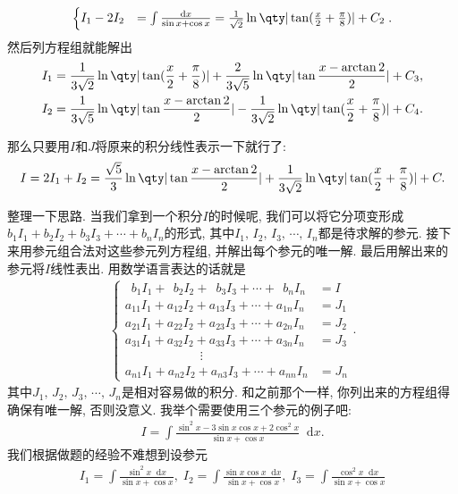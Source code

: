 \documentclass{ctexbook}
\newcommand*{\dif}{\mathop{}\!\mathrm{d}}
\begin{document}
{\begin{align*}
\begin{cases}
I_{1}-2I_{2}&=\int\frac{\dif{x}}{\sin{x}+\cos{x}}=\frac{1}{\sqrt{2}}\ln\qty|\tan(\frac{x}{2}+\frac{\pi}{8})|+C_{2}
\end{cases}
.\end{align*}
然后列方程组就能解出
\begin{align*}
I_{1}={}&\frac{1}{3\sqrt{2}}\ln\qty|\tan(\frac{x}{2}+\frac{\pi}{8})|+\frac{2}{3\sqrt{5}}\ln\qty|\tan{\frac{x-\arctan{2}}{2}}|+C_{3},\\
I_{2}={}&\frac{1}{3\sqrt{5}}\ln\qty|\tan{\frac{x-\arctan{2}}{2}}|-\frac{1}{3\sqrt{2}}\ln\qty|\tan(\frac{x}{2}+\frac{\pi}{8})|+C_{4}
.\end{align*}\par
那么只要用$I$和$J$将原来的积分线性表示一下就行了: 
\begin{align*}
I=2I_{1}+I_{2}=\frac{\sqrt{5}}{3}\ln\qty|\tan{\frac{x-\arctan{2}}{2}}|+\frac{1}{3\sqrt{2}}\ln\qty|\tan(\frac{x}{2}+\frac{\pi}{8})|+C
.\end{align*}\par
整理一下思路. 当我们拿到一个积分$I$的时候呢, 我们可以将它分项变形成$b_{1}I_{1}+b_{2}I_{2}+b_{3}I_{3}+\cdots+b_{n}I_{n}$的形式, 其中$I_{1},\,I_{2},\,I_{3},\,\cdots,\,I_{n}$都是待求解的参元. 接下来用参元组合法对这些参元列方程组, 并解出每个参元的唯一解. 最后用解出来的参元将$I$线性表出. 用数学语言表达的话就是
\begin{align*}
\begin{cases}
\;\:b_{1}I_{1}+\;\,b_{2}I_{2}+\;\:b_{3}I_{3}+\cdots+\;\,b_{n}I_{n}&=I\\
a_{11}I_{1}+a_{12}I_{2}+a_{13}I_{3}+\cdots+a_{1n}I_{n}&=J_{1}\\
a_{21}I_{1}+a_{22}I_{2}+a_{23}I_{3}+\cdots+a_{2n}I_{n}&=J_{2}\\
a_{31}I_{1}+a_{32}I_{2}+a_{33}I_{3}+\cdots+a_{3n}I_{n}&=J_{3}\\
\qquad\qquad\qquad\vdots\\
a_{n1}I_{1}+a_{n2}I_{2}+a_{n3}I_{3}+\cdots+a_{nn}I_{n}&=J_{n}
\end{cases}
.\end{align*}
其中$J_{1},\,J_{2},\,J_{3},\,\cdots,\,J_{n}$是相对容易做的积分. 和之前那个一样, 你列出来的方程组得确保有唯一解, 否则没意义. 
我举个需要使用三个参元的例子吧: 
\begin{align*}
I=\int\frac{\sin^{2}{x}-3\sin{x}\cos{x}+2\cos^{2}{x}}{\sin{x}+\cos{x}}\dif{x}
.\end{align*}
我们根据做题的经验不难想到设参元
\begin{align*}
I_{1}=\int\frac{\sin^{2}{x}\dif{x}}{\sin{x}+\cos{x}},\;I_{2}=\int\frac{\sin{x}\cos{x}\dif{x}}{\sin{x}+\cos{x}},\;I_{3}=\int\frac{\cos^{2}{x}\dif{x}}{\sin{x}+\cos{x}}

\end{align*}}
\end{document}
